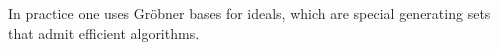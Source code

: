 In practice one uses Gröbner bases for ideals, which are special generating sets
that admit efficient algorithms.
